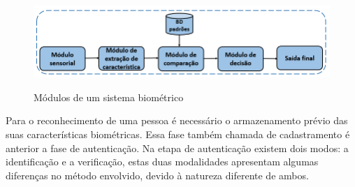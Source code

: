 \begin{figure}[H]
\centering
\caption{Módulos de um sistema biométrico}
\includegraphics[scale = 0.66]{imgs3/modulos_biometria.png}
\label{fig:modulos}
\end{figure}

Para o reconhecimento de uma pessoa é necessário o armazenamento prévio das suas características biométricas. Essa fase também chamada de cadastramento é anterior a fase de autenticação. Na etapa de autenticação existem dois modos: a identificação e a verificação, estas duas modalidades apresentam algumas diferenças no método envolvido, devido à natureza diferente de ambos.
